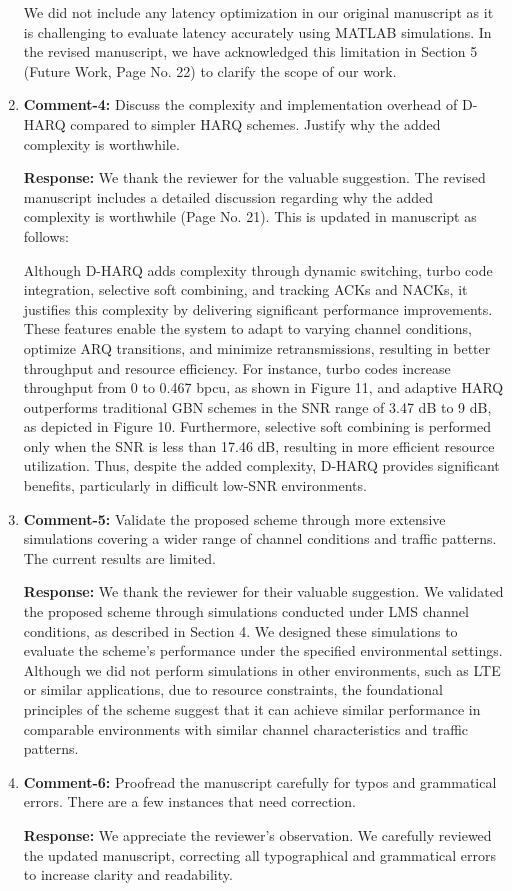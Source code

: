 \documentclass[a4paper,10pt]{article}
\begin{document}
\begin{enumerate}
We did not include any latency optimization in our original manuscript as it is challenging to evaluate latency accurately using MATLAB simulations. In the revised manuscript, we have acknowledged this limitation in Section 5 (Future Work, Page No. 22) to clarify the scope of our work.

\item {\color{blue} \textbf{Comment-4:} Discuss the complexity and implementation overhead of D-HARQ compared to simpler HARQ schemes. Justify why the added complexity is worthwhile.} 

\textbf{Response:}  We thank the reviewer for the valuable suggestion. The revised manuscript includes a detailed discussion regarding why the added complexity is worthwhile (Page No. 21). This is updated in manuscript as follows:

Although D-HARQ adds complexity through dynamic switching, turbo code integration, selective soft combining, and tracking ACKs and NACKs, it justifies this complexity by delivering significant performance improvements. These features enable the system to adapt to varying channel conditions, optimize ARQ transitions, and minimize retransmissions, resulting in better throughput and resource efficiency. For instance, turbo codes increase throughput from 0 to 0.467 bpcu, as shown in Figure 11, and adaptive HARQ outperforms traditional GBN schemes in the SNR range of 3.47 dB to 9 dB, as depicted in Figure 10. Furthermore, selective soft combining is performed only when the SNR is less than 17.46 dB, resulting in more efficient resource utilization. Thus, despite the added complexity, D-HARQ provides significant benefits, particularly in difficult low-SNR environments.

\item {\color{blue} \textbf{Comment-5:} Validate the proposed scheme through more extensive simulations covering a wider range of channel conditions and traffic patterns. The current results are limited.}

\textbf{Response:} We thank the reviewer for their valuable suggestion. We validated the proposed scheme through simulations conducted under LMS channel conditions, as described in Section 4. We designed these simulations to evaluate the scheme's performance under the specified environmental settings. Although we did not perform simulations in other environments, such as LTE or similar applications, due to resource constraints, the foundational principles of the scheme suggest that it can achieve similar performance in comparable environments with similar channel characteristics and traffic patterns.  

\item {\color{blue} \textbf{Comment-6:} Proofread the manuscript carefully for typos and grammatical errors. There are a few instances that need correction.}

\textbf{Response:} We appreciate the reviewer's observation. We carefully reviewed the updated manuscript, correcting all typographical and grammatical errors to increase clarity and readability.

\end{enumerate}
\end{document}
